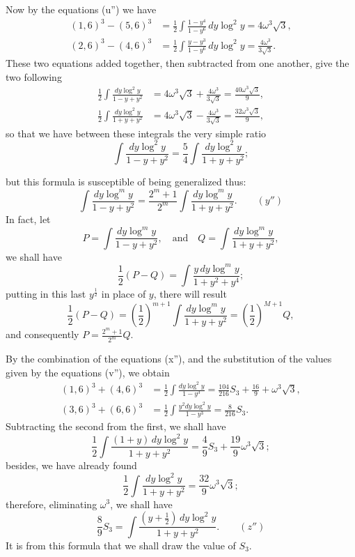 \documentclass{article}
\begin{document}
Now by the equations (u'') we have
\[ \begin{aligned} (1,6)^{3}-(5,6)^{3}&=\frac{1}{2}\int\frac{1-y^{4}}{1-y^{6}}\,dy\log^{2}y=4\omega^{3}\sqrt{3},\\ (2,6)^{3}-(4,6)^{3}&=\frac{1}{2}\int\frac{y-y^{3}}{1-y^{6}}\,dy\log^{2}y=\frac{4\omega^{3}}{3\sqrt{3}}. \end{aligned} \]
These two equations added together, then subtracted from one another, give the two following
\[ \begin{aligned} \frac{1}{2}\int\frac{dy\log^{2}y}{1-y+y^{2}}&=4\omega^{3}\sqrt{3}+\frac{4\omega^{3}}{3\sqrt{3}}=\frac{40\omega^{3}\sqrt{3}}{9},\\ \frac{1}{2}\int\frac{dy\log^{2}y}{1+y+y^{2}}&=4\omega^{3}\sqrt{3}-\frac{4\omega^{3}}{3\sqrt{3}}=\frac{32\omega^{3}\sqrt{3}}{9}, \end{aligned} \]
so that we have between these integrals the very simple ratio
\[ \int\frac{dy\log^{2}y}{1-y+y^{2}}=\frac{5}{4}\int\frac{dy\log^{2}y}{1+y+y^{2}}; \]

but this formula is susceptible of being generalized thus:
\[ \int\frac{dy\log^{m}y}{1-y+y^{2}}=\frac{2^{m}+1}{2^{m}}\int\frac{dy\log^{m}y}{1+y+y^{2}}.\qquad(y'') \]
In fact, let
\[ P=\int\frac{dy\log^{m}y}{1-y+y^{2}},\quad\text{and}\quad Q=\int\frac{dy\log^{m}y}{1+y+y^{2}}, \]
we shall have
\[ \frac{1}{2}(P-Q)=\int\frac{y\,dy\log^{m}y}{1+y^{2}+y^{4}}; \]
putting in this last $y^{\frac{1}{2}}$ in place of $y$, there will result
\[ \frac{1}{2}(P-Q)=\left(\frac{1}{2}\right)^{m+1}\int\frac{dy\log^{m}y}{1+y+y^{2}}=\left(\frac{1}{2}\right)^{M+1}Q, \]
and consequently $P=\frac{2^{m}+1}{2^{m}}Q$.

By the combination of the equations (x''), and the substitution of the values given by the equations (v''), we obtain
\[ \begin{aligned} (1,6)^{3}+(4,6)^{3}&=\frac{1}{2}\int\frac{dy\log^{2}y}{1-y^{3}}=\frac{104}{216}S_{3}+\frac{16}{9}+\omega^{3}\sqrt{3},\\ (3,6)^{3}+(6,6)^{3}&=\frac{1}{2}\int\frac{y^{2}dy\log^{2}y}{1-y^{3}}=\frac{8}{216}S_{3}. \end{aligned} \]
Subtracting the second from the first, we shall have
\[ \frac{1}{2}\int\frac{(1+y)\,dy\log^{2}y}{1+y+y^{2}}=\frac{4}{9}S_{3}+\frac{19}{9}\omega^{3}\sqrt{3}; \]
besides, we have already found
\[ \frac{1}{2}\int\frac{dy\log^{2}y}{1+y+y^{2}}=\frac{32}{9}\omega^{3}\sqrt{3}; \]
therefore, eliminating $\omega^{3}$, we shall have
\[ \frac{8}{9}S_{3}=\int\frac{(y+\frac{1}{2})\,dy\log^{2}y}{1+y+y^{2}}.\qquad(z'') \]
It is from this formula that we shall draw the value of $S_{3}$.
\end{document}
